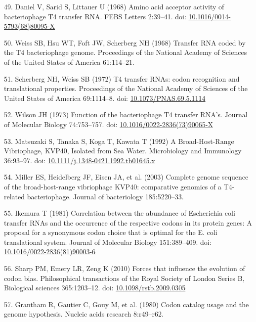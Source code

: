 \documentclass[12pt,twoside]{mitthesis-manusdown}
\begin{document}
\hypertarget{ref-Daniel1968}{}
49. Daniel V, Sarid S, Littauer U (1968) Amino acid acceptor activity of
bacteriophage T4 transfer RNA. FEBS Letters 2:39--41. doi:
\href{https://doi.org/10.1016/0014-5793(68)80095-X}{10.1016/0014-5793(68)80095-X}

\hypertarget{ref-Weiss1968}{}
50. Weiss SB, Hsu WT, Foft JW, Scherberg NH (1968) Transfer RNA coded by
the T4 bacteriophage genome. Proceedings of the National Academy of
Sciences of the United States of America 61:114--21.

\hypertarget{ref-Scherberg1972}{}
51. Scherberg NH, Weiss SB (1972) T4 transfer RNAs: codon recognition
and translational properties. Proceedings of the National Academy of
Sciences of the United States of America 69:1114--8. doi:
\href{https://doi.org/10.1073/PNAS.69.5.1114}{10.1073/PNAS.69.5.1114}

\hypertarget{ref-Wilson1973}{}
52. Wilson JH (1973) Function of the bacteriophage T4 transfer RNA's.
Journal of Molecular Biology 74:753--757. doi:
\href{https://doi.org/10.1016/0022-2836(73)90065-X}{10.1016/0022-2836(73)90065-X}

\hypertarget{ref-Matsuzaki1992}{}
53. Matsuzaki S, Tanaka S, Koga T, Kawata T (1992) A Broad-Host-Range
Vibriophage, KVP40, Isolated from Sea Water. Microbiology and Immunology
36:93--97. doi:
\href{https://doi.org/10.1111/j.1348-0421.1992.tb01645.x}{10.1111/j.1348-0421.1992.tb01645.x}

\hypertarget{ref-Miller2003}{}
54. Miller ES, Heidelberg JF, Eisen JA, et al. (2003) Complete genome
sequence of the broad-host-range vibriophage KVP40: comparative genomics
of a T4-related bacteriophage. Journal of bacteriology 185:5220--33.

\hypertarget{ref-Ikemura1981}{}
55. Ikemura T (1981) Correlation between the abundance of Escherichia
coli transfer RNAs and the occurrence of the respective codons in its
protein genes: A proposal for a synonymous codon choice that is optimal
for the E. coli translational system. Journal of Molecular Biology
151:389--409. doi:
\href{https://doi.org/10.1016/0022-2836(81)90003-6}{10.1016/0022-2836(81)90003-6}

\hypertarget{ref-Sharp2010}{}
56. Sharp PM, Emery LR, Zeng K (2010) Forces that influence the
evolution of codon bias. Philosophical transactions of the Royal Society
of London Series B, Biological sciences 365:1203--12. doi:
\href{https://doi.org/10.1098/rstb.2009.0305}{10.1098/rstb.2009.0305}

\hypertarget{ref-Grantham1980}{}
57. Grantham R, Gautier C, Gouy M, et al. (1980) Codon catalog usage and
the genome hypothesis. Nucleic acids research 8:r49--r62.
\end{document}
